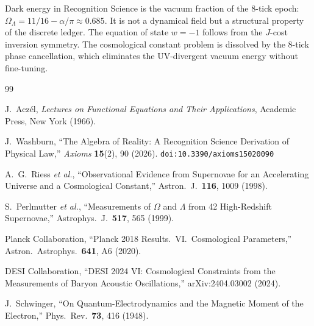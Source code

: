\documentclass[12pt,a4paper]{article}
\theoremstyle{definition}
\theoremstyle{remark}
\begin{document}
Dark energy in Recognition Science is the vacuum fraction of the
8-tick epoch: $\Omega_\Lambda = 11/16 - \alpha/\pi \approx 0.685$.
It is not a dynamical field but a structural property of the discrete
ledger.  The equation of state $w = -1$ follows from the $J$-cost
inversion symmetry.  The cosmological constant problem is dissolved
by the 8-tick phase cancellation, which eliminates the UV-divergent
vacuum energy without fine-tuning.

\begin{thebibliography}{99}

J.~Acz\'el, \emph{Lectures on Functional Equations and Their Applications},
Academic Press, New York (1966).

J.~Washburn, ``The Algebra of Reality: A Recognition Science Derivation
of Physical Law,'' \emph{Axioms} \textbf{15}(2), 90 (2026).
\texttt{doi:10.3390/axioms15020090}

A.~G.~Riess \textit{et al.}, ``Observational Evidence from
Supernovae for an Accelerating Universe and a Cosmological
Constant,'' Astron.\ J.\ \textbf{116}, 1009 (1998).

S.~Perlmutter \textit{et al.}, ``Measurements of $\Omega$ and
$\Lambda$ from 42 High-Redshift Supernovae,'' Astrophys.\ J.\
\textbf{517}, 565 (1999).

Planck Collaboration, ``Planck 2018 Results.\ VI.\ Cosmological
Parameters,'' Astron.\ Astrophys.\ \textbf{641}, A6 (2020).

DESI Collaboration, ``DESI 2024 VI: Cosmological Constraints from
the Measurements of Baryon Acoustic Oscillations,''
arXiv:2404.03002 (2024).

J.~Schwinger, ``On Quantum-Electrodynamics and the Magnetic Moment
of the Electron,'' Phys.\ Rev.\ \textbf{73}, 416 (1948).

\end{thebibliography}
\end{document}
